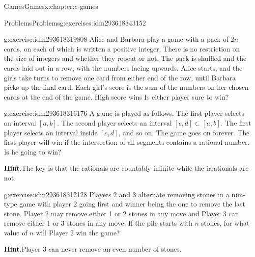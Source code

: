 \documentclass[twoside,10pt,]{book}
\newcommand{\blocktitlefont}{\relax}
\numberwithin{equation}{section}
\begin{document}
\begin{chapterptx}{Games}{}{Games}{}{}{x:chapter:c-games}
\begin{exercises-section}{Problems}{}{Problems}{}{}{g:exercises:idm293618343152}
\begin{divisionexercise}{8}{}{}{g:exercise:idm293618319808}%
Alice and Barbara play a game with a pack of \(2n\) cards, on each of which is written a positive integer. There is no restriction on the size of integers and whether they repeat or not.   The pack is shuffled and the cards laid out in a row, with the numbers facing upwards. Alice starts, and the girls take turns to remove one card from either end of the row, until Barbara picks up the final card. Each girl's score is the sum of the numbers on her chosen cards at the end of the game. High score wins  Is either player sure to win?%
\end{divisionexercise}%
\begin{divisionexercise}{9}{}{}{g:exercise:idm293618316176}%
A game is played as follows. The first player selects an interval \([a, b]\). The second player selects an interval \([c, d] \subset  [a, b]\). The first player selects an interval inside \([c, d]\), and so on. The game goes on forever. The first player will win if the intersection of all segments contains a rational number. Is he going to win?%
\par\smallskip%
\noindent\textbf{\blocktitlefont Hint}.\label{g:hint:idm293618313344}{}\hypertarget{g:hint:idm293618313344}{}\quad{}The key is that the rationals are countably infinite while the irrationals are not.%
\end{divisionexercise}%
\begin{divisionexercise}{10}{}{}{g:exercise:idm293618312128}%
Players 2 and 3 alternate removing stones in a nim-type game with player 2 going first and winner being the one to remove the last stone. Player 2 may remove either 1 or 2 stones in any move and Player 3 can remove either 1 or 3 stones in any move.  If the pile starts with \(n\) stones, for what value of \(n\) will Player 2 win the game?%
\par\smallskip%
\noindent\textbf{\blocktitlefont Hint}.\label{g:hint:idm293618311024}{}\hypertarget{g:hint:idm293618311024}{}\quad{}Player 3 can never remove an even number of stones.%
\end{divisionexercise}%
\end{exercises-section}
\end{chapterptx}
%
%
\typeout{************************************************}
\typeout{************************************************}
%
\end{document}
